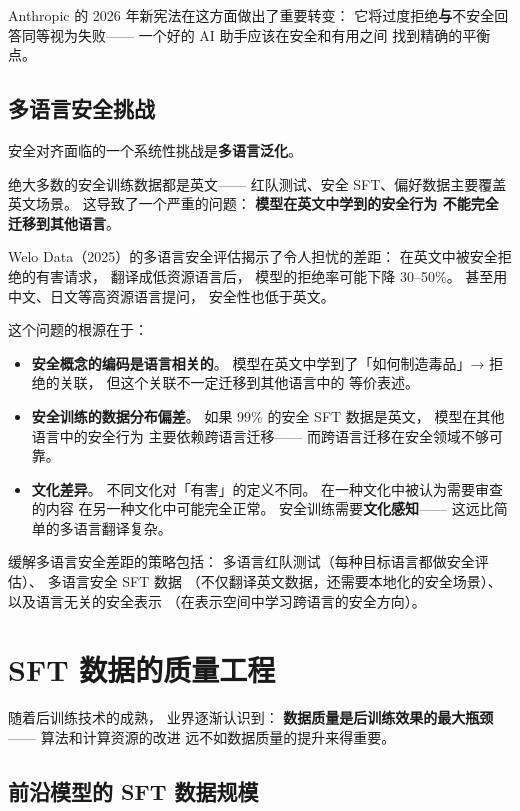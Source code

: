 Anthropic 的 2026 年新宪法在这方面做出了重要转变：
它将过度拒绝\textbf{与}不安全回答同等视为失败——
一个好的 AI 助手应该在安全和有用之间
找到精确的平衡点。

\subsection{多语言安全挑战}

安全对齐面临的一个系统性挑战是\textbf{多语言泛化}。

绝大多数的安全训练数据都是英文——
红队测试、安全 SFT、偏好数据主要覆盖英文场景。
这导致了一个严重的问题：
\textbf{模型在英文中学到的安全行为
不能完全迁移到其他语言}。

Welo Data（2025）的多语言安全评估揭示了令人担忧的差距：
在英文中被安全拒绝的有害请求，
翻译成低资源语言后，
模型的拒绝率可能下降 30--50\%。
甚至用中文、日文等高资源语言提问，
安全性也低于英文。

这个问题的根源在于：
\begin{itemize}[noitemsep]
  \item \textbf{安全概念的编码是语言相关的}。
        模型在英文中学到了「如何制造毒品」→ 拒绝的关联，
        但这个关联不一定迁移到其他语言中的
        等价表述。
  \item \textbf{安全训练的数据分布偏差}。
        如果 99\% 的安全 SFT 数据是英文，
        模型在其他语言中的安全行为
        主要依赖跨语言迁移——
        而跨语言迁移在安全领域不够可靠。
  \item \textbf{文化差异}。
        不同文化对「有害」的定义不同。
        在一种文化中被认为需要审查的内容
        在另一种文化中可能完全正常。
        安全训练需要\textbf{文化感知}——
        这远比简单的多语言翻译复杂。
\end{itemize}

缓解多语言安全差距的策略包括：
多语言红队测试（每种目标语言都做安全评估）、
多语言安全 SFT 数据
（不仅翻译英文数据，还需要本地化的安全场景）、
以及语言无关的安全表示
（在表示空间中学习跨语言的安全方向）。

\section{SFT 数据的质量工程}
\label{sec:sft-data-quality}

随着后训练技术的成熟，
业界逐渐认识到：
\textbf{数据质量是后训练效果的最大瓶颈}——
算法和计算资源的改进
远不如数据质量的提升来得重要。

\subsection{前沿模型的 SFT 数据规模}

